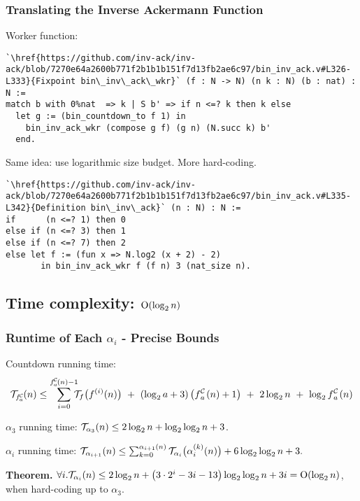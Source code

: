 \begin{frame}[fragile]
\frametitle{Translating the Inverse Ackermann Function}

Worker function:

\begin{lstlisting}
`\href{https://github.com/inv-ack/inv-ack/blob/7270e64a2600b771f2b1b1b151f7d13fb2ae6c97/bin_inv_ack.v#L326-L333}{Fixpoint bin\_inv\_ack\_wkr}` (f : N -> N) (n k : N) (b : nat) : N :=
match b with 0%nat  => k | S b' => if n <=? k then k else
  let g := (bin_countdown_to f 1) in
    bin_inv_ack_wkr (compose g f) (g n) (N.succ k) b'
  end.
\end{lstlisting}

\pause 
Same idea: use logarithmic size budget. More hard-coding.

\pause 
\begin{lstlisting}
`\href{https://github.com/inv-ack/inv-ack/blob/7270e64a2600b771f2b1b1b151f7d13fb2ae6c97/bin_inv_ack.v#L335-L342}{Definition bin\_inv\_ack}` (n : N) : N :=
if      (n <=? 1) then 0
else if (n <=? 3) then 1
else if (n <=? 7) then 2
else let f := (fun x => N.log2 (x + 2) - 2)
       in bin_inv_ack_wkr f (f n) 3 (nat_size n).
\end{lstlisting}

\end{frame}


\subsection{Time complexity: $\text{O} (\log_2n)$}


\begin{frame}
\frametitle{Runtime of Each $\alpha_i$ - Precise Bounds}

Countdown running time:
\begin{equation*}
\runtime_{\cdt{f}{a}}(n) \le \sum_{i=0}^{\cdt{f}{a}(n) - 1} \hspace{-6pt}
\runtime_f\big(f^{(i)}(n)\big) \ + \ (\log_2a + 3)\left(\cdt{f}{a}(n) + 1\right) \ + \ 2\log_2n \ + \ \log_2\cdt{f}{a}(n)
\end{equation*}

\pause 
$\alpha_3$ running time: $\mathcal{T}_{\alpha_3}(n) \le 2\log_2n + \log_2\log_2n + 3$.

\bigskip

\pause 
$\alpha_i$ running time:
$
\mathcal{T}_{\alpha_{i+1}}(n) \le
\sum_{k=0}^{\alpha_{i+1}(n)}\mathcal{T}_{\alpha_i}\big(\alpha_i^{(k)}(n)\big)
+ 6\log_2\log_2n + 3.
$

\bigskip

\pause 
\textbf{Theorem.} $\forall i. \mathcal{T}_{\alpha_i}(n) \le 2\log_2n + \left(3\cdot 2^i - 3i - 13\right)\log_2\log_2n + 3i = \text{O}(\log_2n)$, when hard-coding up to $\alpha_3$.

\end{frame}



